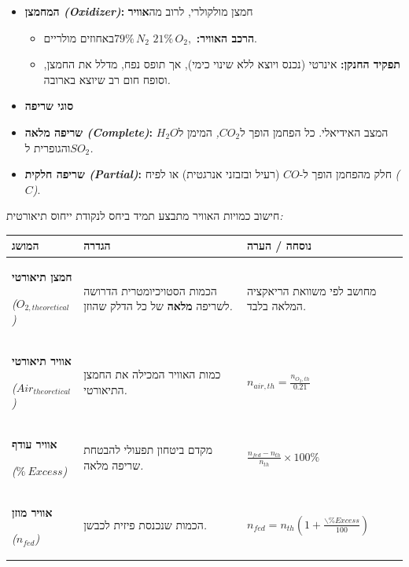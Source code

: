 \documentclass[
  hebrew,
  letterpaper,
  DIV=11,
  numbers=noendperiod]{scrreprt}
\begin{document}
\begin{itemize}
\item
  \textbf{המחמצן \emph{(Oxidizer)}:} חמצן מולקולרי, לרוב
  מה\textbf{אוויר}

  \begin{itemize}
  \item
    \textbf{הרכב האוויר:} \(21\%\, O_{2},\) \(79\%\, N_{2}\)באחוזים
    מולריים.
  \item
    \textbf{תפקיד החנקן:} אינרטי (נכנס ויוצא ללא שינוי כימי), אך תופס
    נפח, מדלל את החמצן, וסופח חום רב שיוצא בארובה\emph{.}
  \end{itemize}
\item
  \textbf{סוגי שריפה}
\end{itemize}

\begin{itemize}
\item
  \textbf{שריפה מלאה \emph{(Complete)}:} המצב האידיאלי. כל הפחמן הופך
  ל\(CO_{2}\)\emph{,} המימן ל\(H_{2}O\) והגופרית ל\(SO_{2}\)\emph{.}
\item
  \textbf{שריפה חלקית \emph{(Partial)}:} חלק מהפחמן הופך ל-\(CO\) (רעיל
  ובזבזני אנרגטית) או לפיח \emph{(}\(C\)\emph{)}.
\end{itemize}

חישוב כמויות האוויר מתבצע תמיד ביחס לנקודת ייחוס תיאורטית\emph{:}

\begin{longtable}[]{@{}
  >{\centering\arraybackslash}p{}
  >{\raggedright\arraybackslash}p{}
  >{\raggedright\arraybackslash}p{}@{}}
\toprule\noalign{}
\begin{minipage}[b]{\linewidth}\centering
\textbf{המושג}
\end{minipage} & \begin{minipage}[b]{\linewidth}\raggedright
\textbf{הגדרה}
\end{minipage} & \begin{minipage}[b]{\linewidth}\raggedright
\textbf{נוסחה / הערה}
\end{minipage} \\
\midrule\noalign{}
\endhead
\bottomrule\noalign{}
\endlastfoot
\textbf{חמצן תיאורטי}

\emph{(}\(O_{2,theoretical}\)\emph{)} & הכמות הסטויכיומטרית הדרושה
לשריפה \textbf{מלאה} של כל הדלק שהוזן\emph{.} & מחושב לפי משוואת
הריאקציה המלאה בלבד\emph{.} \\
\textbf{אוויר תיאורטי}

\emph{(}\(Air_{theoretical}\)\emph{)} & כמות האוויר המכילה את החמצן
התיאורטי\emph{.} & \(n_{air,th} = \frac{n_{O_{2},th}}{0.21}\) \\
\textbf{אוויר עודף}

\emph{(}\(\%\ Excess\)\emph{)} & מקדם ביטחון תפעולי להבטחת שריפה
מלאה\emph{.} & \(\frac{n_{fed} - n_{th}}{n_{th}} \times 100\%\) \\
\textbf{אוויר מוזן}

\emph{(}\(n_{fed}\)\emph{)} & הכמות שנכנסת פיזית לכבשן\emph{.} &
\(n_{fed} = n_{th}\left( 1 + \frac{\backslash\% Excess}{100} \right)\) \\
\end{longtable}
\end{document}
